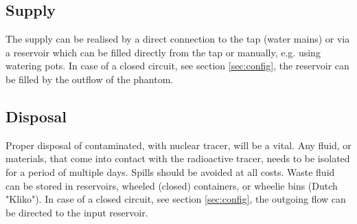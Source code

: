 \subsection*{Supply}
The supply can be realised by a direct connection to the tap (water mains) or via a reservoir which can be filled directly from the tap or manually, e.g. using watering pots. In case of a closed circuit, see section \ref{sec:config}, the reservoir can be filled by the outflow of the phantom.
\subsection*{Disposal}
Proper disposal of contaminated, with nuclear tracer, will be a vital. Any fluid, or materials, that come into contact with the radioactive tracer, needs to be isolated for a period of multiple days. Spills should be avoided at all costs. Waste fluid can be stored in reservoirs, wheeled (closed) containers, or wheelie bins (Dutch "Kliko"). In case of a closed circuit, see section \ref{sec:config}, the outgoing flow can be directed to the input reservoir.


